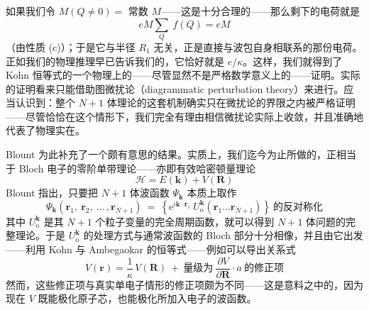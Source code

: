 如果我们令 $M(Q\neq 0)=$ 常数 $M$——这是十分合理的——那么剩下的电荷就是
\begin{equation*}
eM\sum_{Q}\ f(Q) = eM
\end{equation*}
（由性质 (c)）；于是它与半径 $R_1$ 无关，正是直接与波包自身相联系的那份电荷。正如我们的物理推理早已告诉我们的，它恰好就是 $e/\kappa$。这样，我们就得到了 Kohn 恒等式的一个物理上的——尽管显然不是严格数学意义上的——证明。实际的证明看来只能借助图微扰论（diagrammatic perturbation theory）来进行。应当认识到：整个 $N{+}1$ 体理论的这套机制确实只在微扰论的界限之内被严格证明——尽管恰恰在这个情形下，我们完全有理由相信微扰论实际上收敛，并且准确地代表了物理实在。

Blount 为此补充了一个颇有意思的结果。实质上，我们迄今为止所做的，正相当于 Bloch 电子的零阶单带理论——亦即有效哈密顿量理论
\begin{equation*}
\mathcal{H} = E(\mathbf{k}) + V(\mathbf{R})
\end{equation*}
Blount 指出，只要把 $N{+}1$ 体波函数 $\Psi_{\mathbf{k}}$ 本质上取作
\begin{equation*}
\Psi_{\mathbf{k}}(\mathbf{r}_1,\ \mathbf{r}_2,\ \ldots\,,\mathbf{r}_{N+1})\ =\ \left\{\mathrm{e}^{i\mathbf{k}\cdot\mathbf{r}_1}\ U_{\mathrm{o}}^{\mathbf{k}}\left(\mathbf{r}_1\ldots\mathbf{r}_{N+1}\right)\right\}\ \text{的反对称化}
\end{equation*}
其中 $U_{\mathrm{o}}^{\mathbf{k}}$ 是其 $N{+}1$ 个粒子变量的完全周期函数，就可以得到 $N{+}1$ 体问题的完整理论。于是 $U_{\mathrm{o}}^{\mathbf{k}}$ 的处理方式与通常波函数的 Bloch 部分十分相像，并且由它出发——利用 Kohn 与 Ambegaokar 的恒等式——例如可以导出关系式
\begin{equation*}
V(\mathbf{r}) = \frac{1}{\kappa}\,V(\mathbf{R})\ +\ \text{量级为}\ \frac{\partial V}{\partial \mathbf{R}}\cdot a\ \text{的修正项}
\end{equation*}
然而，这些修正项与真实单电子情形的修正项颇为不同——这是意料之中的，因为现在 $V$ 既能极化原子芯，也能极化所加入电子的波函数。
